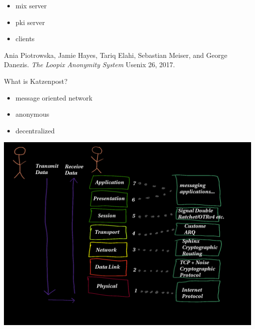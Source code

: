 \documentclass[fleqn,xcolor={usenames,dvipsnames}]{beamer} %
\begin{document}
\begin{frame}
\begin{center}
  \begin{itemize}
  \item mix server
  \item pki server
  \item clients
  \end{itemize}  
\end{center}
\end{frame}


\begin{frame}
\hspace*{3pt} Ania Piotrowska, Jamie Hayes, Tariq Elahi, Sebastian Meiser, and
\hspace*{3pt} George Danezis. {\em The Loopix Anonymity System} Usenix 26, 2017.
\end{frame}


\begin{frame}{What is Katzenpost?}
  \begin{itemize}
  \item message oriented network
  \item anonymous
  \item decentralized
  \end{itemize}    
\end{frame}

\begin{frame}
\begin{center}
\includegraphics[scale=.19]{pics/osi_model}
\end{center}
\end{frame}
\end{document}
